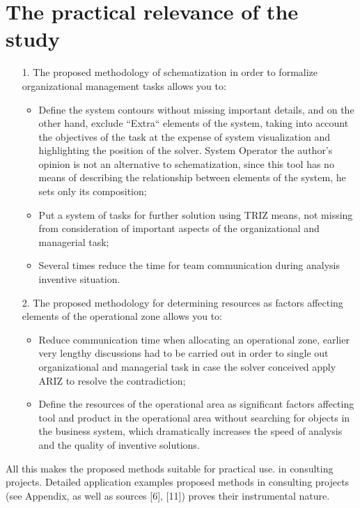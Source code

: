 \section{The practical relevance of the study}
\begin{itemize}
\item[1.] The proposed methodology of schematization in order to formalize organizational
management tasks allows you to:
\begin{itemize}
\item Define the system contours without missing important details, and on the
  other hand, exclude “Extra“ elements of the system, taking into account the
  objectives of the task at the expense of system visualization and
  highlighting the position of the solver. System Operator the author’s
  opinion is not an alternative to schematization, since this tool has no
  means of describing the relationship between elements of the system, he sets
  only its composition;
\item Put a system of tasks for further solution using TRIZ means, not missing
  from consideration of important aspects of the organizational and managerial
  task;
\item Several times reduce the time for team communication during analysis
inventive situation.
\end{itemize}
\item [2.] The proposed methodology for determining resources as factors
  affecting elements of the operational zone allows you to:
\begin{itemize}
\item Reduce communication time when allocating an operational zone, earlier
  very lengthy discussions had to be carried out in order to single out
  organizational and managerial task in case the solver conceived apply ARIZ
  to resolve the contradiction;
\item Define the resources of the operational area as significant factors
  affecting tool and product in the operational area without searching for
  objects in the business system, which dramatically increases the speed of
  analysis and the quality of inventive solutions.
\end{itemize}
\end{itemize}
All this makes the proposed methods suitable for practical use.
in consulting projects. Detailed application examples
proposed methods in consulting projects (see Appendix, as well as sources
[6], [11]) proves their instrumental nature.

